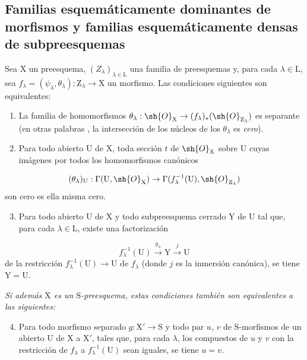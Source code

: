 \subsection{Familias esquemáticamente dominantes de morfismos y familias esquemáticamente densas de subpreesquemas}
\label{subsection:IV.11.10}

\begin{proposition}[11.10.1]
\label{IV.11.10.1}
Sea $\mathrm{X}$ un preesquema, $(Z_\lambda)_{\lambda\in\mathrm{L}}$ una familia de preesquemas y, para cada $\lambda\in\mathrm{L}$, sea $f_\lambda=(\psi_\lambda,\theta_\lambda):\mathrm{Z}_\lambda\to\mathrm{X}$ un morfismo.
Las condiciones siguientes son equivalentes:
\begin{enumerate}[label=\emph{\alph*)}]
  \item La familia de homomorfismos $\theta_\lambda:\sh{O}_\mathrm{X}\to(f_\lambda)_*(\sh{O}_{\mathrm{Z}_\lambda})$ es separante (en otras palabras , la intersección de los núcleos de los $\theta_\lambda$ es \emph{cero}).
  \item Para todo abierto $\mathrm{U}$ de $\mathrm{X}$, toda sección $t$ de $\sh{O}_\mathrm{X}$ sobre $\mathrm{U}$ cuyas imágenes por todos los homomorfismos canónicos
\end{enumerate}
\[
  (\theta_\lambda)_\mathrm{U}:\Gamma(\mathrm{U},\sh{O}_\mathrm{X})\to\Gamma(f_\lambda^{-1}(\mathrm{U}),\sh{O}_{\mathrm{Z}_\lambda})
\label{IV.11.10.1.1}
\]
son cero es ella misma cero.
\begin{enumerate}[label=\emph{\alph*)}]
\setcounter{enumi}{2}
  \item Para todo abierto $\mathrm{U}$ de $\mathrm{X}$ y todo subpreesquema cerrado $\mathrm{Y}$ de $\mathrm{U}$ tal que, para cada $\lambda\in\mathrm{L}$, existe una factorización
\end{enumerate}
\[
  f_\lambda^{-1}(\mathrm{U})\xrightarrow{g_\lambda}\mathrm{Y}\xrightarrow{j}\mathrm{U}
\label{IV.11.10.1.2}
\]
de la restricción $f_\lambda^{-1}(\mathrm{U})\to\mathrm{U}$ de $f_\lambda$ (donde $j$ es la inmersión canónica), se tiene $\mathrm{Y}=\mathrm{U}$.

\emph{Si además $\mathrm{X}$ es un $\mathrm{S}$-preesquema, estas condiciones también son equivalentes a las siguientes:}
\begin{enumerate}[label=\emph{\alph*)}]
\setcounter{enumi}{3}
  \item Para todo morfismo separado $g:\mathrm{X}'\to\mathrm{S}$ y todo par $u$, $v$ de $\mathrm{S}$-morfismos de un abierto $\mathrm{U}$ de $\mathrm{X}$ a $\mathrm{X}'$, tales que, para cada $\lambda$, los compuestos de $u$ y $v$ con la restricción de $f_\lambda$ a $f_\lambda^{-1}(\mathrm{U})$ sean iguales, se tiene $u=v$.
\end{enumerate}
\end{proposition}

